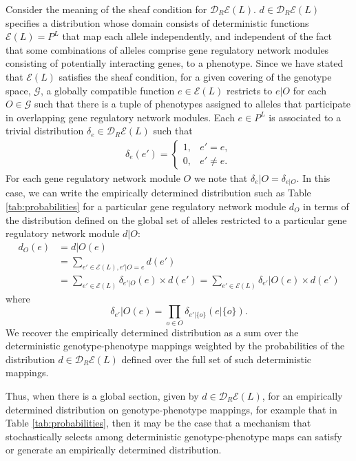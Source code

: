 \documentclass[10pt]{article}
\begin{document}
Consider the meaning of the sheaf condition for $\mathcal{D}_R\mathcal{E}(L)$. $d \in \mathcal{D}_R\mathcal{E}(L)$ specifies a distribution whose domain consists of deterministic functions $\mathcal{E}(L) = P^L$ that map each allele independently, and independent of the fact that some combinations of alleles  comprise gene regulatory network modules consisting of potentially interacting genes, to a phenotype. Since we have stated that $\mathcal{E}(L)$ satisfies the sheaf condition, for a given covering of the genotype space, $\mathcal{G}$, a globally compatible function $e \in  \mathcal{E}(L)$ restricts to $e|O$ for each $O \in \mathcal{G}$ such that there is a tuple of phenotypes assigned to alleles that participate in overlapping gene regulatory network modules. Each $e \in P^L$ is associated to a trivial distribution $\delta_e \in \mathcal{D}_R\mathcal{E}(L)$ such that 
\begin{eqnarray}
\delta_e(e') =
\begin{cases}
1, & e' = e,\\
0, & e' \neq e.
\end{cases}
\end{eqnarray}
For each gene regulatory network module $O$ we note that $\delta_e|O = \delta_{e|O}$. In this case, we can write the empirically determined distribution such as Table \ref{tab:probabilities} for a particular gene regulatory network module $d_O$ in terms of the distribution defined on the global set of alleles restricted to a particular gene regulatory network module $d|O$:
\begin{equation}\label{eq:factordist}
\begin{split}
d_O(e) &= d|O(e)\\
&= \sum_{e' \in \mathcal{E}(L),e'|O=e} d(e')\\
&= \sum_{e' \in \mathcal{E}(L)} \delta_{e'|O}(e) \times d(e') = \sum_{e' \in \mathcal{E}(L)} \delta_{e'}|O(e) \times d(e')
\end{split}
\end{equation}
where
\begin{equation*}
\delta_{e'}|O(e) = \prod_{o \in O} \delta_{e'|\{o\}}(e|\{o\}).
\end{equation*}
We recover the empirically determined distribution as a sum over the deterministic genotype-phenotype mappings weighted by the probabilities of the distribution $d \in \mathcal{D}_R\mathcal{E}(L)$ defined over the full set of such deterministic mappings.

Thus, when there is a global section, given by $d \in \mathcal{D}_R\mathcal{E}(L)$, for an empirically determined distribution on genotype-phenotype mappings, for example that in Table \ref{tab:probabilities}, then it may be the case that a mechanism that stochastically selects among deterministic genotype-phenotype maps can satisfy or generate an empirically determined distribution.
\end{document}
